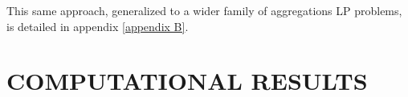 \documentclass[smallextended,natbib]{svjour3}       %
\numberwithin{theorem}{section}
\begin{document}
This same approach, generalized to a wider family of aggregations LP problems, is detailed in appendix \ref{appendix B}.

























\section{COMPUTATIONAL RESULTS}\label{section: comp res}



\end{document}
